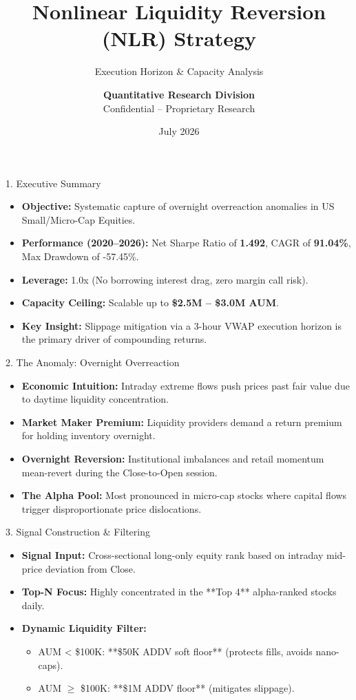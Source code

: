 \documentclass[10pt,aspectratio=169]{beamer}
\title{\textbf{Nonlinear Liquidity Reversion (NLR) Strategy}}
\subtitle{Execution Horizon \& Capacity Analysis}
\author{\textbf{Quantitative Research Division} \\ Confidential -- Proprietary Research}
\date{July 2026}
\begin{document}
\maketitle

\begin{frame}{1. Executive Summary}
    \begin{itemize}
        \item \textbf{Objective:} Systematic capture of overnight overreaction anomalies in US Small/Micro-Cap Equities.
        \item \textbf{Performance (2020--2026):} Net Sharpe Ratio of \textbf{1.492}, CAGR of \textbf{91.04\%}, Max Drawdown of -57.45\%.
        \item \textbf{Leverage:} 1.0x (No borrowing interest drag, zero margin call risk).
        \item \textbf{Capacity Ceiling:} Scalable up to \textbf{\$2.5M -- \$3.0M AUM}.
        \item \textbf{Key Insight:} Slippage mitigation via a 3-hour VWAP execution horizon is the primary driver of compounding returns.
    \end{itemize}
\end{frame}

\begin{frame}{2. The Anomaly: Overnight Overreaction}
    \begin{itemize}
        \item \textbf{Economic Intuition:} Intraday extreme flows push prices past fair value due to daytime liquidity concentration.
        \item \textbf{Market Maker Premium:} Liquidity providers demand a return premium for holding inventory overnight.
        \item \textbf{Overnight Reversion:} Institutional imbalances and retail momentum mean-revert during the Close-to-Open session.
        \item \textbf{The Alpha Pool:} Most pronounced in micro-cap stocks where capital flows trigger disproportionate price dislocations.
    \end{itemize}
\end{frame}

\begin{frame}{3. Signal Construction \& Filtering}
    \begin{itemize}
        \item \textbf{Signal Input:} Cross-sectional long-only equity rank based on intraday mid-price deviation from Close.
        \item \textbf{Top-N Focus:} Highly concentrated in the **Top 4** alpha-ranked stocks daily.
        \item \textbf{Dynamic Liquidity Filter:}
            \begin{itemize}
                \item AUM < \$100K: **\$50K ADDV soft floor** (protects fills, avoids nano-caps).
                \item AUM $\ge$ \$100K: **\$1M ADDV floor** (mitigates slippage).
            \end{itemize}
    \end{itemize}
\end{frame}
\end{document}
